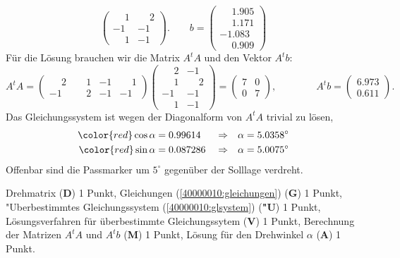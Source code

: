 \begin{loesung}
\[\begin{pmatrix}
\phantom{-}1&\phantom{-}2\\
         - 1&         - 1\\
\phantom{-}1&         - 1
\end{pmatrix}.
\qquad
b=
\begin{pmatrix}
\phantom{-}1.905\\
\phantom{-}1.171\\
         - 1.083\\
\phantom{-}0.909
\end{pmatrix}
\]
Für die Lösung brauchen wir die Matrix $A^tA$ und den Vektor $A^tb$:
\[
A^tA=
\begin{pmatrix}
\phantom{-}2&\phantom{-}1&-1&\phantom{-}1\\
         - 1&\phantom{-}2&-1&         - 1
\end{pmatrix}
\begin{pmatrix}
\phantom{-}2&         - 1\\
\phantom{-}1&\phantom{-}2\\
         - 1&         - 1\\
\phantom{-}1&         - 1
\end{pmatrix}
=
\begin{pmatrix}
7&0\\
0&7
\end{pmatrix},
\qquad
\qquad
A^tb
=
\begin{pmatrix}
6.973\\ 0.611
\end{pmatrix}.
\]
Das Gleichungssystem ist wegen der Diagonalform von $A^tA$ trivial zu lösen,
\begin{align*}
\color{red} \cos\alpha&=0.99614
&&\Rightarrow&\alpha&=5.0358^\circ
\\
\color{red} \sin\alpha&=0.087286
&&\Rightarrow&
\alpha&=5.0075^\circ
\end{align*}
Offenbar sind die Passmarker um $5^\circ$ gegenüber der Solllage verdreht.
\end{loesung}

\begin{bewertung}
Drehmatrix ({\bf D}) 1 Punkt,
Gleichungen (\ref{40000010:gleichungen}) ({\bf G}) 1 Punkt,
"Uberbestimmtes Gleichungssystem (\ref{40000010:glsystem}) ({\bf "U}) 1 Punkt,
Lösungsverfahren für überbestimmte Gleichungssytem ({\bf V}) 1 Punkt,
Berechnung der Matrizen $A^tA$ und $A^tb$ ({\bf M}) 1 Punkt,
Lösung für den Drehwinkel $\alpha$ ({\bf A}) 1 Punkt.
\end{bewertung}

